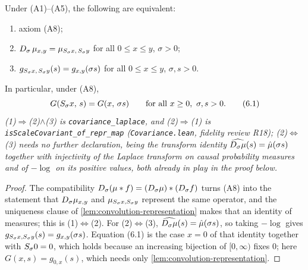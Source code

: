\begin{lemma}\label{lem:covariance-laplace}
\leanok
Under (A1)--(A5), the following are equivalent:
\begin{enumerate}
\item axiom (A8);
\item $D_\sigma\,\mu_{x,y} = \mu_{S_\sigma x,\,S_\sigma y}$ for all
$0 \le x \le y$, $\sigma > 0$;
\item $g_{S_\sigma x,\,S_\sigma y}(s) = g_{x,y}(\sigma s)$ for all
$0 \le x \le y$, $\sigma, s > 0$.
\end{enumerate}
In particular, under (A8),
\[
  G(S_\sigma x,\, s) = G(x,\, \sigma s)
  \qquad \text{for all } x \ge 0,\ \sigma, s > 0. \tag{6.1}
\]
\statusT\quad\emph{(1)$\Rightarrow$(2)$\wedge$(3) is \texttt{covariance\_laplace}, and
(2)$\Rightarrow$(1) is \texttt{isScaleCovariant\_of\_repr\_map} (\texttt{Covariance.lean},
fidelity review R18); (2)$\Leftrightarrow$(3) needs no further declaration, being the
transform identity $\widehat{D_\sigma\mu}(s) = \hat\mu(\sigma s)$ together with
injectivity of the Laplace transform on causal probability measures and of $-\log$ on its
positive values, both already in play in the proof below.}
\end{lemma}

\begin{proof}
\leanok
The compatibility $D_\sigma(\mu * f) = (D_\sigma\mu) * (D_\sigma f)$ turns (A8) into
the statement that $D_\sigma\mu_{x,y}$ and $\mu_{S_\sigma x, S_\sigma y}$ represent
the same operator, and the uniqueness clause of \ref{lem:convolution-representation} makes
that an identity of measures; this is (1)$\Leftrightarrow$(2). For (2)$\Leftrightarrow$(3),
$\widehat{D_\sigma\mu}(s) = \hat\mu(\sigma s)$, so taking $-\log$ gives
$g_{S_\sigma x, S_\sigma y}(s) = g_{x,y}(\sigma s)$. Equation (6.1) is the case
$x = 0$ of that identity together with $S_\sigma 0 = 0$, which holds because an increasing
bijection of $[0,\infty)$ fixes $0$; here $G(x,s) = g_{0,x}(s)$, which needs only
\ref{lem:convolution-representation}.
\end{proof}

